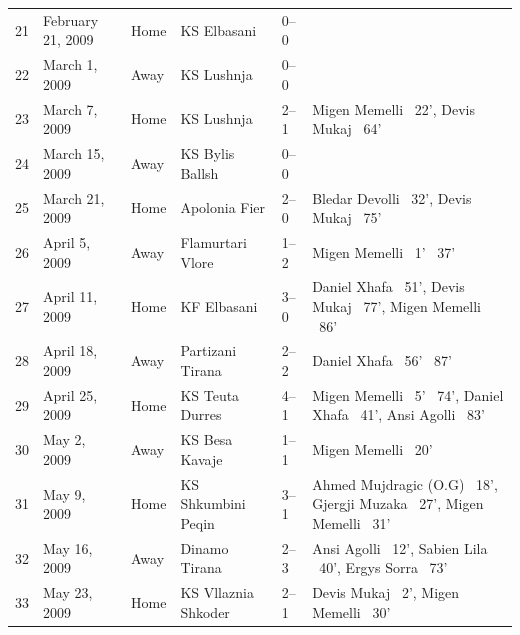 \documentclass{article}
\begin{document}
\begin{tabular}{llllll}
21 & February 21, 2009 & Home & KS Elbasani & 0–0 &  \\
22 & March 1, 2009 & Away & KS Lushnja & 0–0 &  \\
23 & March 7, 2009 & Home & KS Lushnja & 2–1 & Migen Memelli  22', Devis Mukaj  64' \\
24 & March 15, 2009 & Away & KS Bylis Ballsh & 0–0 &  \\
25 & March 21, 2009 & Home & Apolonia Fier & 2–0 & Bledar Devolli  32', Devis Mukaj  75' \\
26 & April 5, 2009 & Away & Flamurtari Vlore & 1–2 & Migen Memelli  1'  37' \\
27 & April 11, 2009 & Home & KF Elbasani & 3–0 & Daniel Xhafa  51', Devis Mukaj  77', Migen Memelli  86' \\
28 & April 18, 2009 & Away & Partizani Tirana & 2–2 & Daniel Xhafa  56'  87' \\
29 & April 25, 2009 & Home & KS Teuta Durres & 4–1 & Migen Memelli  5'  74', Daniel Xhafa  41', Ansi Agolli  83' \\
30 & May 2, 2009 & Away & KS Besa Kavaje & 1–1 & Migen Memelli  20' \\
31 & May 9, 2009 & Home & KS Shkumbini Peqin & 3–1 & Ahmed Mujdragic (O.G)  18', Gjergji Muzaka  27', Migen Memelli  31' \\
32 & May 16, 2009 & Away & Dinamo Tirana & 2–3 & Ansi Agolli  12', Sabien Lila  40', Ergys Sorra  73' \\
33 & May 23, 2009 & Home & KS Vllaznia Shkoder & 2–1 & Devis Mukaj  2', Migen Memelli  30' \\
\bottomrule
\end{tabular}
\end{document}
